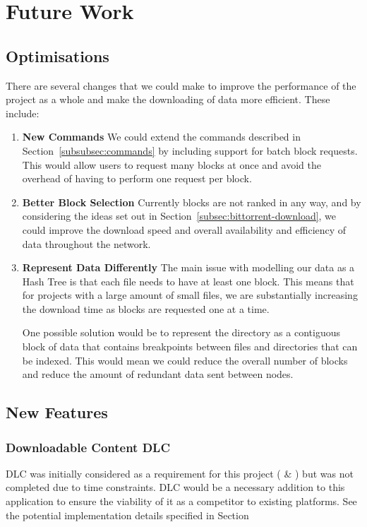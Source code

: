 \section{Future Work}

\subsection{Optimisations}

There are several changes that we could make to improve the performance of the project as a whole and make the downloading of data more efficient. These include:

\begin{enumerate}
  \item \textbf{New Commands} We could extend the commands described in Section~\ref{subsubsec:commands} by including support for batch block requests. This would allow users to request many blocks at once and avoid the overhead of having to perform one request per block.  
  \item \textbf{Better Block Selection} Currently blocks are not ranked in any way, and by considering the ideas set out in Section~\ref{subsec:bittorrent-download}, we could improve the download speed and overall availability and efficiency of data throughout the network.
  \item \textbf{Represent Data Differently} The main issue with modelling our data as a Hash Tree is that each file needs to have at least one block. This means that for projects with a large amount of small files, we are substantially increasing the download time as blocks are requested one at a time.

  One possible solution would be to represent the directory as a contiguous block of data that contains breakpoints between files and directories that can be indexed. This would mean we could reduce the overall number of blocks and reduce the amount of redundant data sent between nodes.
\end{enumerate}

\subsection{New Features}

\subsubsection{Downloadable Content DLC}
DLC was initially considered as a requirement for this project ( \& ) but was not completed due to time constraints. DLC would be a necessary addition to this application to ensure the viability of it as a competitor to existing platforms. See the potential implementation details specified in Section

